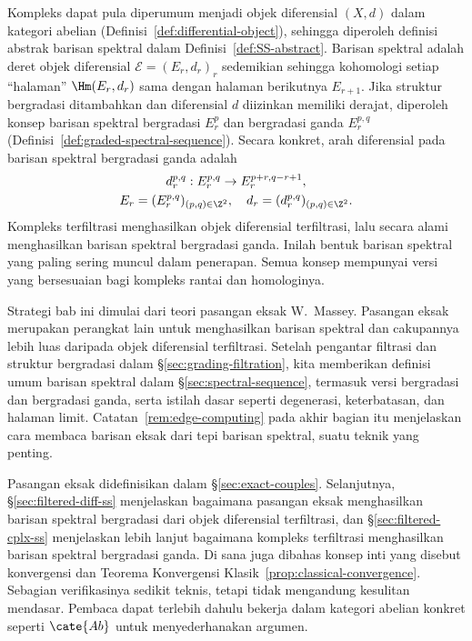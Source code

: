 Kompleks dapat pula diperumum menjadi objek diferensial $(X,d)$ dalam kategori
abelian (Definisi~\ref{def:differential-object}), sehingga diperoleh definisi
abstrak barisan spektral dalam Definisi~\ref{def:SS-abstract}. Barisan spektral
adalah deret objek diferensial $\mathscr{E}=(E_r,d_r)_r$ sedemikian sehingga
kohomologi setiap ``halaman'' $\Hm(E_r,d_r)$ sama dengan halaman berikutnya
$E_{r+1}$. Jika struktur bergradasi ditambahkan dan diferensial $d$ diizinkan
memiliki derajat, diperoleh konsep barisan spektral bergradasi $E_r^p$ dan
bergradasi ganda $E_r^{p,q}$ (Definisi~\ref{def:graded-spectral-sequence}).
Secara konkret, arah diferensial pada barisan spektral bergradasi ganda adalah
\begin{gather*}
	d_r^{p, q}: E_r^{p, q} \to E_r^{p+r, q-r+1}, \\
	E_r = (E_r^{p, q})_{(p, q) \in \Z^2}, \quad d_r = (d_r^{p, q})_{(p, q) \in \Z^2}.
\end{gather*}
Kompleks terfiltrasi menghasilkan objek diferensial terfiltrasi, lalu secara
alami menghasilkan barisan spektral bergradasi ganda. Inilah bentuk barisan
spektral yang paling sering muncul dalam penerapan. Semua konsep mempunyai
versi yang bersesuaian bagi kompleks rantai dan homologinya.

Strategi bab ini dimulai dari teori pasangan eksak W.\ Massey. Pasangan eksak
merupakan perangkat lain untuk menghasilkan barisan spektral dan cakupannya
lebih luas daripada objek diferensial terfiltrasi. Setelah pengantar filtrasi
dan struktur bergradasi dalam \S\ref{sec:grading-filtration}, kita memberikan
definisi umum barisan spektral dalam \S\ref{sec:spectral-sequence}, termasuk
versi bergradasi dan bergradasi ganda, serta istilah dasar seperti degenerasi,
keterbatasan, dan halaman limit. Catatan~\ref{rem:edge-computing} pada akhir
bagian itu menjelaskan cara membaca barisan eksak dari tepi barisan spektral,
suatu teknik yang penting.

Pasangan eksak didefinisikan dalam \S\ref{sec:exact-couples}. Selanjutnya,
\S\ref{sec:filtered-diff-ss} menjelaskan bagaimana pasangan eksak menghasilkan
barisan spektral bergradasi dari objek diferensial terfiltrasi, dan
\S\ref{sec:filtered-cplx-ss} menjelaskan lebih lanjut bagaimana kompleks
terfiltrasi menghasilkan barisan spektral bergradasi ganda. Di sana juga
dibahas konsep inti yang disebut konvergensi dan
Teorema Konvergensi Klasik~\ref{prop:classical-convergence}. Sebagian
verifikasinya sedikit teknis, tetapi tidak mengandung kesulitan mendasar.
Pembaca dapat terlebih dahulu bekerja dalam kategori abelian konkret seperti
$\cate{Ab}$ untuk menyederhanakan argumen.

